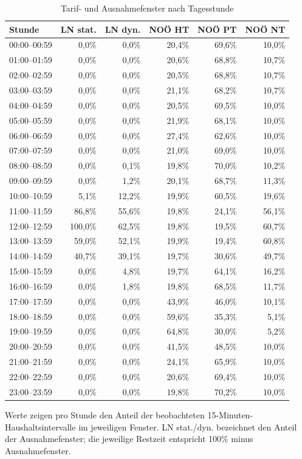 \begin{table}[H]
\centering
\scriptsize
\caption{Tarif- und Ausnahmefenster nach Tagesstunde}
\label{tab:tariff_window_hourly_shares}
\setlength{\tabcolsep}{4pt}
\begin{tabular}{lrrrrr}
\toprule
Stunde & LN stat. & LN dyn. & NOÖ HT & NOÖ PT & NOÖ NT \\
\midrule
00:00--00:59 & 0,0\% & 0,0\% & 20,4\% & 69,6\% & 10,0\% \\
01:00--01:59 & 0,0\% & 0,0\% & 20,6\% & 68,8\% & 10,7\% \\
02:00--02:59 & 0,0\% & 0,0\% & 20,5\% & 68,8\% & 10,7\% \\
03:00--03:59 & 0,0\% & 0,0\% & 21,1\% & 68,2\% & 10,7\% \\
04:00--04:59 & 0,0\% & 0,0\% & 20,5\% & 69,5\% & 10,0\% \\
05:00--05:59 & 0,0\% & 0,0\% & 21,9\% & 68,1\% & 10,0\% \\
06:00--06:59 & 0,0\% & 0,0\% & 27,4\% & 62,6\% & 10,0\% \\
07:00--07:59 & 0,0\% & 0,0\% & 21,0\% & 69,0\% & 10,0\% \\
08:00--08:59 & 0,0\% & 0,1\% & 19,8\% & 70,0\% & 10,2\% \\
09:00--09:59 & 0,0\% & 1,2\% & 20,1\% & 68,7\% & 11,3\% \\
10:00--10:59 & 5,1\% & 12,2\% & 19,9\% & 60,5\% & 19,6\% \\
11:00--11:59 & 86,8\% & 55,6\% & 19,8\% & 24,1\% & 56,1\% \\
12:00--12:59 & 100,0\% & 62,5\% & 19,8\% & 19,5\% & 60,7\% \\
13:00--13:59 & 59,0\% & 52,1\% & 19,9\% & 19,4\% & 60,8\% \\
14:00--14:59 & 40,7\% & 39,1\% & 19,7\% & 30,6\% & 49,7\% \\
15:00--15:59 & 0,0\% & 4,8\% & 19,7\% & 64,1\% & 16,2\% \\
16:00--16:59 & 0,0\% & 1,8\% & 19,8\% & 68,5\% & 11,7\% \\
17:00--17:59 & 0,0\% & 0,0\% & 43,9\% & 46,0\% & 10,1\% \\
18:00--18:59 & 0,0\% & 0,0\% & 59,6\% & 35,3\% & 5,1\% \\
19:00--19:59 & 0,0\% & 0,0\% & 64,8\% & 30,0\% & 5,2\% \\
20:00--20:59 & 0,0\% & 0,0\% & 41,5\% & 48,5\% & 10,0\% \\
21:00--21:59 & 0,0\% & 0,0\% & 24,1\% & 65,9\% & 10,0\% \\
22:00--22:59 & 0,0\% & 0,0\% & 20,6\% & 69,4\% & 10,0\% \\
23:00--23:59 & 0,0\% & 0,0\% & 19,8\% & 70,2\% & 10,0\% \\
\bottomrule
\end{tabular}
\begin{flushleft}
\footnotesize Werte zeigen pro Stunde den Anteil der beobachteten 15-Minuten-Haushaltsintervalle im jeweiligen Fenster. LN stat./dyn. bezeichnet den Anteil der Ausnahmefenster; die jeweilige Restzeit entspricht 100\% minus Ausnahmefenster.
\end{flushleft}
\end{table}
